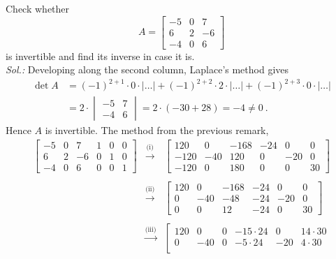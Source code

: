 \begin{example} Check whether
\[ A = \begin{bmatrix}
-5 & 0 & 7 \\ 6 & 2 & -6 \\ -4 & 0 & 6
\end{bmatrix} \]
is invertible and find its inverse in case it is.\\
{\it Sol.:} Developing along the second column, Laplace's method gives
\begin{equation*}
\begin{split}
\det A & = (-1)^{2+1} \cdot 0 \cdot \left| \dots \right| 
+ (-1)^{2+2} \cdot 2 \cdot \left| \dots \right| 
+ (-1)^{2+3} \cdot 0 \cdot \left| \dots \right| \\
& = 2 \cdot \begin{vmatrix} -5 & 7 \\ -4 & 6 \end{vmatrix}
= 2 \cdot (-30+28) = -4 \not= 0 \:.
\end{split}
\end{equation*}
Hence $A$ is invertible. The method from the previous remark,
\[\begin{array}{ccc}
\left[\begin{array}{ccc|ccc}
-5 & 0 & 7 & 1 & 0 & 0 \\
6 & 2 & -6 & 0 & 1 & 0 \\ 
-4 & 0 & 6 & 0 & 0 & 1
\end{array}\right] & \stackrel{\text{(i)}}{\rightarrow} & 
\left[\begin{array}{ccc|ccc}
120 & 0 & -168 & -24 & 0 & 0 \\
-120 & -40 & 120 & 0 & -20 & 0 \\ 
-120 & 0 & 180 & 0 & 0 & 30
\end{array}\right] \\ & & \\
& \stackrel{\text{(ii)}}{\rightarrow} & 
\left[\begin{array}{ccc|ccc}
120 & 0 & -168 & -24 & 0 & 0 \\
0 & -40 & -48 & -24 & -20 & 0 \\ 
0 & 0 & 12 & -24 & 0 & 30
\end{array}\right] \\ & & \\
& \stackrel{\text{(iii)}}{\rightarrow} & 
\left[\begin{array}{ccc|ccc}
120 & 0 & 0 & -15\cdot24 & 0 & 14\cdot30 \\
0 & -40 & 0 & -5\cdot24 & -20 & 4\cdot30 \\ 

\end{array}
\end{array}\]
\end{example}
